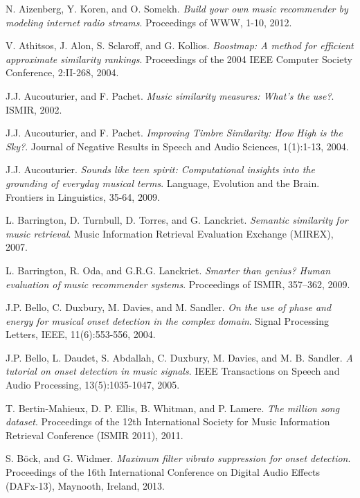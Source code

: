 \documentclass[11pt, oneside, openright]{Thesis} %
\begin{document}
\begin{thebibliography}{99}


N. Aizenberg, Y. Koren, and O. Somekh.
\textit{Build your own music recommender by modeling internet radio streams}.
Proceedings of WWW, 1-10, 2012.

V. Athitsos, J. Alon, S. Sclaroff, and G. Kollios.
\textit{Boostmap: A method for efficient approximate similarity rankings}.
Proceedings of the 2004 IEEE Computer Society Conference, 2:II-268, 2004.

J.J. Aucouturier, and F. Pachet.
\textit{Music similarity measures: What's the use?}. 
ISMIR, 2002.

J.J. Aucouturier, and F. Pachet.
\textit{Improving Timbre Similarity: How High is the Sky?}. 
Journal of Negative Results in Speech and Audio Sciences, 1(1):1-13, 2004.

J.J. Aucouturier.
\textit{Sounds like teen spirit: Computational insights into the grounding of everyday musical terms}. 
Language, Evolution and the Brain. Frontiers in Linguistics, 35-64, 2009.

L. Barrington, D. Turnbull, D. Torres, and G. Lanckriet.
\textit{Semantic similarity for music retrieval}.
Music Information Retrieval Evaluation Exchange (MIREX), 2007.

L. Barrington, R. Oda, and G.R.G. Lanckriet. 
\textit{Smarter than genius? Human evaluation of music recommender systems}. 
Proceedings of ISMIR, 357–362, 2009.

J.P. Bello, C. Duxbury, M. Davies, and M. Sandler.
\textit{On the use of phase and energy for musical onset detection in the complex domain}.
Signal Processing Letters, IEEE, 11(6):553-556, 2004.

J.P. Bello, L. Daudet, S. Abdallah, C. Duxbury, M. Davies, and M. B. Sandler.
\textit{A tutorial on onset detection in music signals}.
IEEE Transactions on Speech and Audio Processing, 13(5):1035-1047, 2005.

T. Bertin-Mahieux, D. P. Ellis, B. Whitman, and P. Lamere. 
\textit{The million song dataset}. 
Proceedings of the 12th International Society for Music Information Retrieval Conference (ISMIR 2011), 2011.

S. Böck, and G. Widmer.
\textit{Maximum filter vibrato suppression for onset detection}.
Proceedings of the 16th International Conference on Digital Audio Effects (DAFx-13), Maynooth, Ireland, 2013.


\end{thebibliography}
\end{document}
